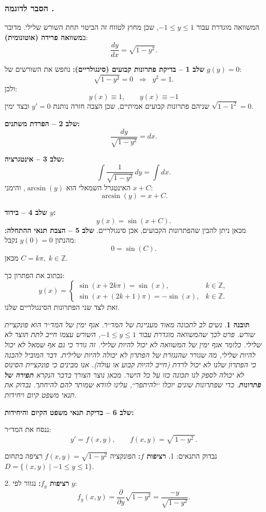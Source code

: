\documentclass{article}
\numberwithin{equation}{section}
\newcounter{example}[section]
\renewcommand{\theexample}{\thesection.\arabic{example}}
\newcommand{\explanation}{%
  \subsubsection*{הסבר לדוגמה \theexample}%
}
\newtheorem{insight}{תובנה}[section]
\begin{document}
\explanation{}

המשוואה מוגדרת עבור $-1 \leq y \leq 1$, שכן מחוץ לטווח זה הביטוי תחת השורש שלילי.  
מדובר ב\textbf{משוואה פרידה (אוטונומית)}:
\[
\frac{dy}{dx} = \sqrt{1-y^2}.
\]

\textbf{שלב 1 – בדיקת פתרונות קבועים (סינגולריים):}  
נחפש את השורשים של $g(y)=0$:
\[
\sqrt{1-y^2} = 0 
\;\;\Longrightarrow\;\; y^2 = 1.
\]
ולכן:
\[
y(x) \equiv 1, 
\qquad 
y(x) \equiv -1
\]
שניהם פתרונות קבועים אמיתיים, שכן הצבה חזרה נותנת $y'=0$ ובצד ימין $\sqrt{1-1^2}=0$.  

\textbf{שלב 2 – הפרדת משתנים:}  
\[
\frac{dy}{\sqrt{1-y^2}} = dx.
\]

\textbf{שלב 3 – אינטגרציה:}  
\[
\int \frac{1}{\sqrt{1-y^2}}\,dy = \int dx.
\]
האינטגרל השמאלי הוא $\arcsin(y)$, והימני $x+C$:
\[
\arcsin(y) = x + C.
\]

\textbf{שלב 4 – בידוד $y$:}  
\[
y(x) = \sin(x+C).
\]
מכאן ניתן להבין שהפתרונות הקבועים, אכן סינגולריים.
\textbf{שלב 5 – הצבת תנאי ההתחלה:}  
מהנתון $y(0)=0$ נקבל:
\[
0 = \sin(C).
\]
מכאן $C=k\pi, \; k\in\mathbb{Z}$.

נכתוב את הפתרון כך:
\[
y(x) =
\begin{cases}
\sin(x+2k\pi)=\sin(x), & k \in \mathbb{Z}, \\[6pt]
\sin(x+(2k+1)\pi) = -\sin(x), & k \in \mathbb{Z}.
\end{cases}
\] 
זאת לצד שני הפתרונות הסינגולריים שלנו.
\begin{insight}
נשים לב לתכונה מאוד מעניינת של המד׳׳ר. אגף ימין של המד׳׳ר הוא פונקציית שורש. פרט לכך שהמשוואה מוגדרת עבור $-1 \leq y \leq 1$, השורש עצמו חייב לתת תוצר לא שלילי. כלומר אגף ימין של המשוואה לא יכול להיות שלילי. זה גורר כי גם אף שמאל לא יכול להיות שלילי, מה שגורר שהנגזרת של הפתרון לא יכולה להיות שלילית. דבר המוביל להבנה כי הפתרון שלנו לא יכול לרדת (חייב להיות קבוע או עולה). אנו מבינים כי פונקציית הסינוס לא יכולה לספק לנו תכונה כזו על כל הישר. מכאן נוצר הצורך בדבר הנקרא \textbf{תפירה של פתרונות}. כדי שפתרונות שונים יוכלו ׳׳להיתפר׳׳, עלינו לוודא שמותר להם להיחתך. נבדוק את תנאי משפט קיום ויחידות.

\end{insight}
\textbf{שלב 6 – בדיקת תנאי משפט הקיום והיחידות:}  

ננסח את המד״ר:
\[
y' = f(x,y), 
\qquad f(x,y) = \sqrt{\,1-y^2\,}.
\]

נבדוק התנאים:
1. \textbf{רציפות $f$:}  
הפונקציה $f(x,y)=\sqrt{1-y^2}$ רציפה בתחום $D=\{(x,y)\mid -1\le y\le 1\}$.

2. \textbf{רציפות $f_y$:}  
נגזור לפי $y$:
\[
f_y(x,y) = \frac{\partial}{\partial y}\sqrt{1-y^2} 
= \frac{-y}{\sqrt{1-y^2}}.
\]
\end{document}
